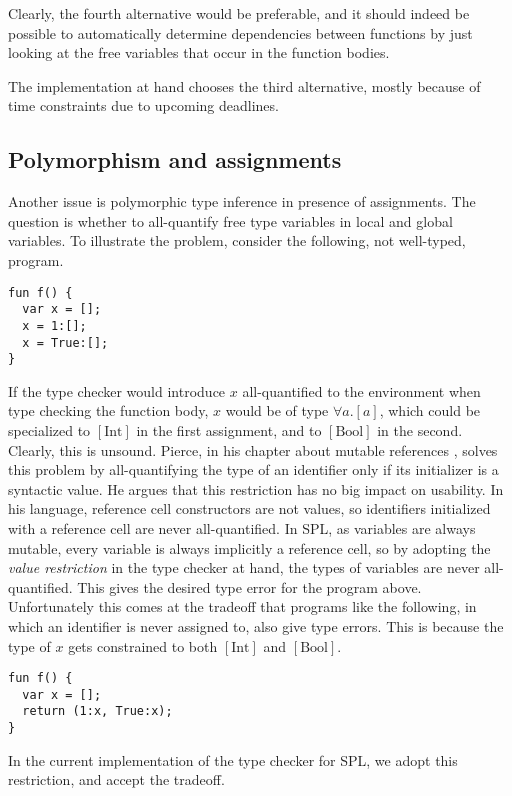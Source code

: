 \documentclass[a4paper]{article}
\begin{document}
Clearly, the fourth alternative would be preferable, and it should indeed be
possible to automatically determine dependencies between functions by just
looking at the free variables that occur in the function bodies.

The implementation at hand chooses the third alternative, mostly because of time
constraints due to upcoming deadlines.

\subsection{Polymorphism and assignments}

Another issue is polymorphic type inference in presence of assignments.  The
question is whether to all-quantify free type variables in local and global
variables.  To illustrate the problem, consider the following, not well-typed,
program.

\begin{verbatim}
fun f() {
  var x = [];
  x = 1:[];
  x = True:[];
}
\end{verbatim}

If the type checker would introduce $x$ all-quantified to the environment when
type checking the function body, $x$ would be of type $\forall a . [a]$, which
could be specialized to $[\text{Int}]$ in the first assignment, and to
$[\text{Bool}]$ in the second.  Clearly, this is unsound.  Pierce, in his
chapter about mutable references \cite{Pierce2002a}, solves this problem by
all-quantifying the type of an identifier only if its initializer is a
syntactic value.  He argues that this restriction has no big impact on
usability.  In his language, reference cell constructors are not values, so
identifiers initialized with a reference cell are never all-quantified.  In
SPL, as variables are always mutable, every variable is always implicitly a
reference cell, so by adopting the \emph{value restriction} in the type checker
at hand, the types of variables are never all-quantified.  This gives the
desired type error for the program above. Unfortunately this comes at the
tradeoff that programs like the following, in which an identifier is never
assigned to, also give type errors. This is because the type of $x$ gets
constrained to both $[\text{Int}]$ and $[\text{Bool}]$.

\begin{verbatim}
fun f() {
  var x = [];
  return (1:x, True:x);
}
\end{verbatim}

In the current implementation of the type checker for SPL, we adopt this
restriction, and accept the tradeoff.
\end{document}
